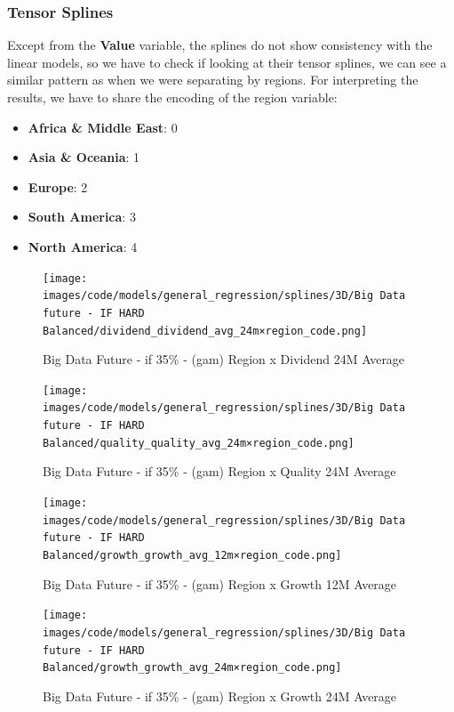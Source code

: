 \documentclass[11pt,english,a4paper,hidelinks]{book}
\begin{document}
\subsubsection{Tensor Splines}

Except from the \textbf{Value} variable, the splines do not show consistency with the linear models, so we have to check if looking at their tensor splines, we can see a similar pattern as when we were separating by regions. For interpreting the results, we have to share the encoding of the region variable:
\begin{itemize}
    \item \textbf{Africa \& Middle East}: 0
    \item \textbf{Asia \& Oceania}: 1
    \item \textbf{Europe}: 2
    \item \textbf{South America}: 3
    \item \textbf{North America}: 4
\end{itemize}



\begin{figure}[H]
    \centering
    \begin{minipage}{0.48\textwidth}
        \centering
        \texttt{[image: images/code/models/general\_regression/splines/3D/Big Data future - IF HARD Balanced/dividend\_dividend\_avg\_24m×region\_code.png]}
        \caption{Big Data Future - \acrshort{if} 35\% - (\acrshort{gam}) Region x Dividend 24M Average}
        \label{fig:tensor_dividend_dividend_avg_24m}
    \end{minipage}\hfill
    \begin{minipage}{0.48\textwidth}
        \centering
        \texttt{[image: images/code/models/general\_regression/splines/3D/Big Data future - IF HARD Balanced/quality\_quality\_avg\_24m×region\_code.png]}
        \caption{Big Data Future - \acrshort{if} 35\% - (\acrshort{gam}) Region x Quality 24M Average}
        \label{fig:tensor_quality_quality_avg_24m}
    \end{minipage}
\end{figure}

\begin{figure}[H]
    \centering
    \begin{minipage}{0.48\textwidth}
        \centering
        \texttt{[image: images/code/models/general\_regression/splines/3D/Big Data future - IF HARD Balanced/growth\_growth\_avg\_12m×region\_code.png]}
        \caption{Big Data Future - \acrshort{if} 35\% - (\acrshort{gam}) Region x Growth 12M Average}
        \label{fig:tensor_growth_growth_avg_12m}
    \end{minipage}\hfill
    \begin{minipage}{0.48\textwidth}
        \centering
        \texttt{[image: images/code/models/general\_regression/splines/3D/Big Data future - IF HARD Balanced/growth\_growth\_avg\_24m×region\_code.png]}
        \caption{Big Data Future - \acrshort{if} 35\% - (\acrshort{gam}) Region x Growth 24M Average}
        \label{fig:tensor_growth_growth_avg_24m}
    \end{minipage}
\end{figure}
\end{document}
